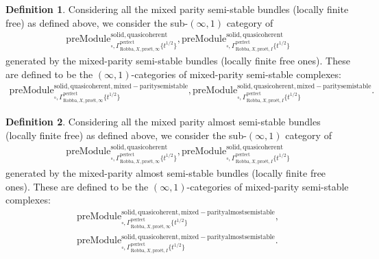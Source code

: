 \documentclass[12pt]{book}
\theoremstyle{definition}
\newtheorem{definition}{Definition}
\begin{document}
\begin{definition}
Considering all the mixed parity semi-stable bundles (locally finite free) as defined above, we consider the sub-$(\infty,1)$ category of 
\begin{align}
\mathrm{preModule}^\mathrm{solid,quasicoherent}_{\square,\Gamma^\mathrm{perfect}_{\text{Robba},X,\text{pro\'et},\infty}\{t^{1/2}\}},
\mathrm{preModule}^\mathrm{solid,quasicoherent}_{\square,\Gamma^\mathrm{perfect}_{\text{Robba},X,\text{pro\'et},I}\{t^{1/2}\}} 
\end{align}
generated by the mixed-parity semi-stable bundles (locally finite free ones). These are defined to be the $(\infty,1)$-categories of mixed-parity semi-stable complexes:
\begin{align}
\mathrm{preModule}^\mathrm{solid,quasicoherent,mixed-paritysemistable}_{\square,\Gamma^\mathrm{perfect}_{\text{Robba},X,\text{pro\'et},\infty}\{t^{1/2}\}},
\mathrm{preModule}^\mathrm{solid,quasicoherent,mixed-paritysemistable}_{\square,\Gamma^\mathrm{perfect}_{\text{Robba},X,\text{pro\'et},I}\{t^{1/2}\}}. 
\end{align}
\end{definition}


\begin{definition}
Considering all the mixed parity almost semi-stable bundles (locally finite free) as defined above, we consider the sub-$(\infty,1)$ category of 
\begin{align}
\mathrm{preModule}^\mathrm{solid,quasicoherent}_{\square,\Gamma^\mathrm{perfect}_{\text{Robba},X,\text{pro\'et},\infty}\{t^{1/2}\}},
\mathrm{preModule}^\mathrm{solid,quasicoherent}_{\square,\Gamma^\mathrm{perfect}_{\text{Robba},X,\text{pro\'et},I}\{t^{1/2}\}} 
\end{align}
generated by the mixed-parity almost semi-stable bundles (locally finite free ones). These are defined to be the $(\infty,1)$-categories of mixed-parity semi-stable complexes:
\begin{align}
\mathrm{preModule}^\mathrm{solid,quasicoherent,mixed-parityalmostsemistable}_{\square,\Gamma^\mathrm{perfect}_{\text{Robba},X,\text{pro\'et},\infty}\{t^{1/2}\}},\\
\mathrm{preModule}^\mathrm{solid,quasicoherent,mixed-parityalmostsemistable}_{\square,\Gamma^\mathrm{perfect}_{\text{Robba},X,\text{pro\'et},I}\{t^{1/2}\}}. 
\end{align}
\end{definition}
\end{document}
